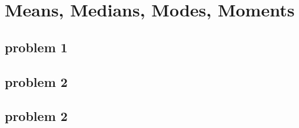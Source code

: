 \section{Means, Medians, Modes, Moments}

\subsection{problem 1}

\subsection{problem 2}







\subsection{problem 2}

